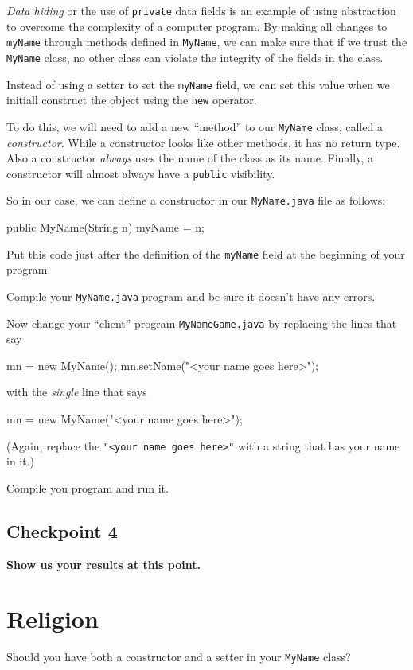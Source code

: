 \documentclass[12pt]{article}
\newenvironment{qv}%
  {\quote
   \verbatim}%
  {\endverbatim
   \endquote}
\newcommand{\code}{\texttt}
\begin{document}
\emph{Data hiding} or the use of \code{private} data fields is an
example of using abstraction to overcome the complexity of a computer
program.  By making all changes to \code{myName} through methods
defined in \code{MyName}, we can make sure that if we trust the
\code{MyName} class, no other class can violate the integrity of the
fields in the class.

Instead of using a setter to set the \code{myName} field, we can set
this value when we initiall construct the object using the \code{new}
operator.

To do this, we will need to add a new ``method'' to our \code{MyName}
class, called a {\em constructor}.  While a constructor looks like other
methods, it has no return type.  Also a constructor {\em always} uses
the name of the class as its name.  Finally, a constructor will almost
always have a \code{public} visibility.

So in our case, we can define a constructor in our \code{MyName.java}
file as follows:

\begin{qv}
public MyName(String n) {
  myName = n;
}
\end{qv}

Put this code just after the definition of the \code{myName} field at
the beginning of your program.

Compile your \code{MyName.java} program and be sure it doesn't have
any errors.

Now change your ``client'' program \code{MyNameGame.java} by replacing
the lines that say

\begin{qv}
mn = new MyName();
mn.setName("<your name goes here>");
\end{qv}

with the {\em single} line that says

\begin{qv}
mn = new MyName("<your name goes here>");
\end{qv}

(Again, replace the \code{"<your name goes here>"} with a string that has
your name in it.)

Compile you program and run it.

\subsection*{Checkpoint 4}
{\bf
Show us your results at this point.
}

\section*{Religion}
Should you have both a constructor and a setter in your
\code{MyName} class?
\end{document}
